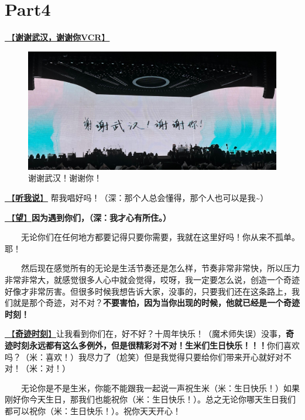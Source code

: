 \documentclass[]{ctexbook}
\begin{document}
\section{Part4}\label{wuhan-20240727-part4}

\hyperref[thank-you-vcr]{🎥【\textbf{谢谢武汉，谢谢你VCR}】}

\begin{figure}

{\centering \includegraphics[width=400pt]{img/wuhan20240727/thank-wuhan} 

}

\caption{谢谢武汉！谢谢你！}\label{fig:unnamed-chunk-67}
\end{figure}

\hyperref[listen-to-me]{🎵【\textbf{听我说}】} 帮我唱好吗！（深：那个人总会懂得，那个人也可以是我\textasciitilde）

\hyperref[Gaze]{🎵【\textbf{望}】}\textbf{因为遇到你们，（深：我才心有所住。）}

  无论你们在任何地方都要记得只要你需要，我就在这里好吗！你从来不孤单。耶！

  然后现在感觉所有的无论是生活节奏还是怎么样，节奏非常非常快，所以压力非常非常大，就感觉很多人心中就会觉得，哎呀，我一定要怎么说，创造一个奇迹好像才非常厉害。但很多时候我想告诉大家，没事的，只要我们还在这条路上，我们就是那个奇迹，对不对？\textbf{不要害怕，因为当你出现的时候，他就已经是一个奇迹时刻！}

\hyperref[magic-moment]{🎵【\textbf{奇迹时刻}】}让我看到你们在，好不好？十周年快乐！（魔术师失误）没事，\textbf{奇迹时刻永远都有这么多例外，但是很精彩对不对！生米们生日快乐！！！}你们喜欢吗？（米：喜欢！）我尽力了（尬笑）但是我觉得只要给你们带来开心就好对不对！（米：对！）

  无论你是不是生米，你能不能跟我一起说一声祝生米（米：生日快乐！）如果刚好你今天生日，那我们也能祝你（米：生日快乐！）。总之无论你哪天生日我们都可以祝你（米：生日快乐！）。祝你天天开心！
\end{document}
